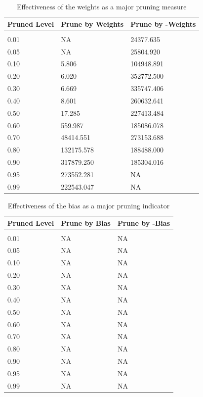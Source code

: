 \documentclass{article} %
\begin{document}
\begin{table}[t]
\caption{Effectiveness of the weights as a major pruning measure}
\label{table-2}
\begin{center}
\begin{tabular}{lll}
\multicolumn{1}{c}{\bf Pruned Level}  &\multicolumn{1}{c}{\bf Prune by Weights} &\multicolumn{1}{c}{\bf Prune by -Weights}
\\ \hline \\
0.01         &NA &24377.635 \\
0.05         &NA &25804.920 \\
0.10         &5.806 &104948.891 \\
0.20         &6.020 &352772.500 \\
0.30         &6.669 &335747.406 \\
0.40         &8.601 &260632.641 \\
0.50         &17.285 &227413.484 \\
0.60         &559.987 &185086.078 \\
0.70         &48414.551 &273153.688 \\
0.80         &132175.578 &188488.000 \\
0.90         &317879.250 &185304.016 \\
0.95         &273552.281 &NA \\
0.99         &222543.047 &NA \\
\end{tabular}
\end{center}
\end{table}

\begin{table}[t]
\caption{Effectiveness of the bias as a major pruning indicator}
\label{table-3}
\begin{center}
\begin{tabular}{lll}
\multicolumn{1}{c}{\bf Pruned Level}  &\multicolumn{1}{c}{\bf Prune by Bias} &\multicolumn{1}{c}{\bf Prune by -Bias}
\\ \hline \\
0.01         &NA &NA \\
0.05         &NA &NA \\
0.10         &NA &NA \\
0.20         &NA &NA \\
0.30         &NA &NA \\
0.40         &NA &NA \\
0.50         &NA &NA \\
0.60         &NA &NA \\
0.70         &NA &NA \\
0.80         &NA &NA \\
0.90         &NA &NA \\
0.95         &NA &NA \\
0.99         &NA &NA \\
\end{tabular}
\end{center}
\end{table}
\end{document}
